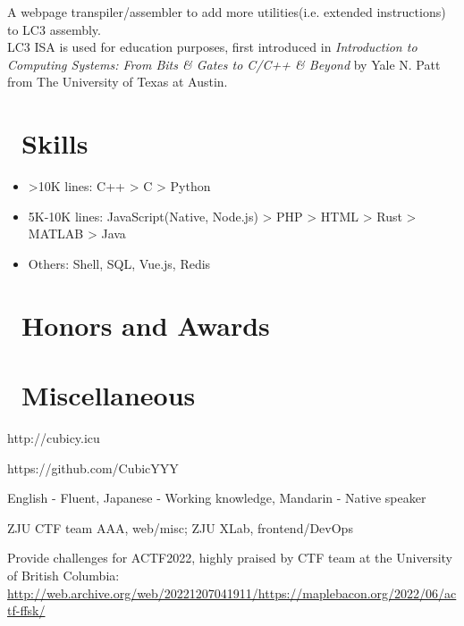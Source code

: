 \documentclass{resume}
\begin{document}
A webpage transpiler/assembler to add more utilities(i.e. extended instructions) to LC3 assembly. \\
LC3 ISA is used for education purposes, first introduced in \textit{Introduction to Computing Systems: From Bits \& Gates to C/C++ \& Beyond} 
by Yale N. Patt from The University of Texas at Austin.

\section{\faCogs\ Skills}
\begin{itemize}[parsep=0.5ex]
  \item >10K lines: C++ > C > Python
  \item 5K-10K lines: JavaScript(Native, Node.js) > PHP > HTML > Rust > MATLAB > Java
  \item Others: Shell, SQL, Vue.js, Redis
\end{itemize}

\section{\faHeartO\ Honors and Awards}

\section{\faInfo\ Miscellaneous}
\begin{description}[parsep=0.5ex]
  \item[Blog] http://cubicy.icu
  \item[GitHub] https://github.com/CubicYYY
  \item[Languages] English - Fluent, Japanese - Working knowledge, Mandarin - Native speaker
  \item[Team] ZJU CTF team AAA, web/misc; ZJU XLab, frontend/DevOps
  \item[Other] Provide challenges for ACTF2022, highly praised by CTF team at the University of British Columbia: \href{http://web.archive.org/web/20221207041911/https://maplebacon.org/2022/06/actf-ffsk/}{http://web.archive.org/web/20221207041911/https://maplebacon.org/2022/06/actf-ffsk/}
\end{description}

%
%
\end{document}
